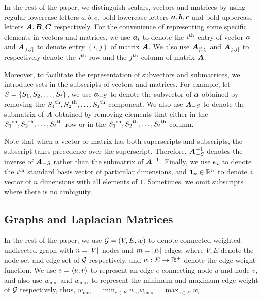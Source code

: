 \documentclass[sigconf]{acmart}
\begin{document}
In the rest of the paper, we distinguish scalars, vectors and matrices by using regular lowercase letters \(a,b,c\), bold lowercase letters \(\boldsymbol{a},\boldsymbol{b},\boldsymbol{c}\) and bold uppercase letters \(\boldsymbol{A},\boldsymbol{B},\boldsymbol{C}\) respectively.
For the convenience of representing some specific elements in vectors and matrices, we use \(\boldsymbol{a}_{i}\) to denote the \({i}^{\rm{th}}\) entry of vector \(\boldsymbol{a}\) and \(\boldsymbol{A}_{[i,j]}\) to denote entry \((i,j)\) of matrix \(\boldsymbol{A}\).
We also use \(\boldsymbol{A}_{[i,:]}\) and \(\boldsymbol{A}_{[:,j]}\) to respectively denote the \({i}^{\rm{th}}\) row and the \({j}^{\rm{th}}\) column of matrix \(\boldsymbol{A}\).

Moreover, to facilitate the representation of subvectors and submatrices, we introduce sets in the subscripts of vectors and matrices.
For example, let \(S=\left\{S_1,S_2,\dots,S_t \right\}\), we use \(\boldsymbol{a}_{-S}\) to denote the subvector of \(\boldsymbol{a}\) obtained by removing the \({S_1}^{\rm{th}},{S_2}^{\rm{th}},\dots,{S_t}^{\rm{th}}\) component.
We also use \(\boldsymbol{A}_{-S}\) to denote the submatrix of \(\boldsymbol{A}\) obtained by removing elements that either in the \({S_1}^{\rm{th}},{S_2}^{\rm{th}},\dots,{S_t}^{\rm{th}}\) row or in the \({S_1}^{\rm{th}},{S_2}^{\rm{th}},\dots,{S_t}^{\rm{th}}\) column.

Note that when a vector or matrix has both superscripts and subscripts, the subscript takes precedence over the superscript.
Therefore, \(\boldsymbol{A}_{-S}^{-1}\) denotes the inverse of \(\boldsymbol{A}_{-S}\) rather than the submatrix of \(\boldsymbol{A}^{-1}\). Finally, we use \(\boldsymbol{e}_i\) to denote the \({i}^{\rm{th}}\) standard basis vector of particular dimensions, and \(\boldsymbol{1}_n\in \mathbb{R}^n\) to denote a vector of \(n\) dimensions with all elements of \(1\). Sometimes, we omit subscripts where there is no ambiguity.

\subsection{Graphs and Laplacian Matrices}\label{sub:lap}

In the rest of the paper, we use \(\mathcal{G}=(V,E,w)\) to denote connected weighted undirected graph with \(n=\left|V \right|\) nodes and \(m=\left|E \right|\) edges, where \(V,E\) denote the node set and edge set of \(\mathcal{G}\) respectively, and \(w:E\to\mathbb{R}^+\) denote the edge weight function.
We use \(e=\langle u, v \rangle\) to represent an edge \(e\) connecting node \(u\) and node \(v\), and also use \(w_{\min}\) and \(w_{\max}\) to represent the minimum and maximum edge weight of \(\mathcal{G}\) respectively, thus, \(w_{\min}=\min_{e\in E}w_e\),\(w_{\max}=\max_{e\in E}w_e\).
\end{document}
